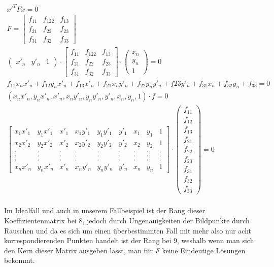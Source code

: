 \begin{gather}
x'^T F x =0\\
F=\begin{bmatrix}
f_{11}&f_{122}&f_{13}\\
f_{21}&f_{22}&f_{23}\\
f_{31}&f_{32}&f_{33}
\end{bmatrix}\\
\begin{pmatrix}
x'_n&y'_n&1
\end{pmatrix} 
\cdot
\begin{bmatrix}
f_{11}&f_{122}&f_{13}\\
f_{21}&f_{22}&f_{23}\\
f_{31}&f_{32}&f_{33}
\end{bmatrix}
\cdot
\begin{pmatrix}
x_n\\y_n\\1
\end{pmatrix} =0\\
f_{11}x_nx'_n+f_{12}y_nx'_n+f_{13}x'_n+f_{21}x_ny'_n+f_{22}y_ny'_n+f{23}y'_n+f_{31}x_n+f_{32}y_n+f_{33} =0\\
(x_nx'_n,y_nx'_n,x'_n,x_ny'_n,y_ny'_n,y'_n,x_n,y_n,1)\cdot f =0\\
\begin{bmatrix}
x_1x'_1&y_1x'_1&x'_1&x_1y'_1&y_1y'_1&y'_1&x_1&y_1&1\\
x_2x'_2&y_2x'_2&x'_2&x_2y'_2&y_2y'_2&y'_2&x_2&y_2&1\\
.&.&.&.&.&.&.&.&.\\
.&.&.&.&.&.&.&.&.\\
.&.&.&.&.&.&.&.&.\\
x_nx'_n&y_nx'_n&x'_n&x_ny'_n&y_ny'_n&y'_n&x_n&y_n&1
\end{bmatrix}
\cdot 
\begin{pmatrix}
f_{11}\\f_{12}\\f_{13}\\f_{21}\\f_{22}\\f_{23}\\f_{31}\\f_{32}\\f_{33}
\end{pmatrix}
= 0
\end{gather}\\

Im Idealfall und auch in unserem Fallbeispiel ist der Rang dieser Koeffizientenmatrix bei 8, jedoch durch Ungenauigkeiten der Bildpunkte durch Rauschen und da es sich um einen überbestimmten Fall mit mehr also nur acht korrespondierenden Punkten handelt ist der Rang bei 9, weshalb wenn man sich den Kern dieser Matrix ausgeben lässt, man für \textit{F} keine Eindeutige Lösungen bekommt. 

